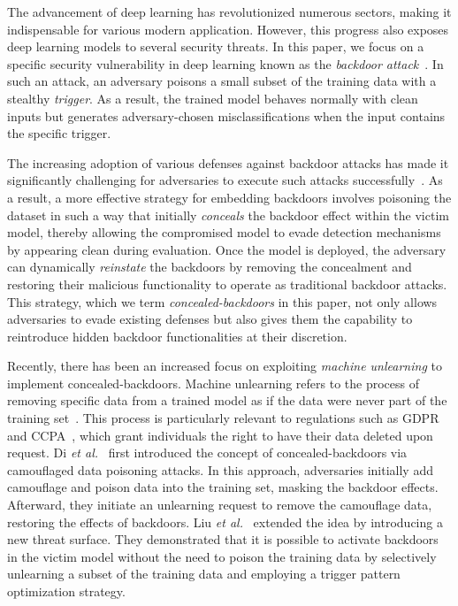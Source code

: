 The advancement of deep learning has revolutionized numerous sectors, making it indispensable for various modern application. However, this progress also exposes deep learning models to several security threats. In this paper, we focus on a specific security vulnerability in deep learning known as the \textit{backdoor attack}~\cite{trojannn,sig,badnets,refool,inputaware,blind,lira,ssba,wanet,lf,ftrojan,bppattack,poisonink}. In such an attack, an adversary poisons a small subset of the training data with a stealthy \textit{trigger}. As a result, the trained model behaves normally with clean inputs but generates adversary-chosen misclassifications when the input contains the specific trigger.

The increasing adoption of various defenses against backdoor attacks has made it significantly challenging for adversaries to execute such attacks successfully~\cite{fp,ss,ac,strip,nc,mcr,spectre,abl,nad,scan,anp,dbr-dst,dbd,ibau,clp,ep-bnp,rnp,nab,teco,beatrix,sau,npd,ftsham}. As a result, a more effective strategy for embedding backdoors involves poisoning the dataset in such a way that initially \textit{conceals} the backdoor effect within the victim model, thereby allowing the compromised model to evade detection mechanisms by appearing clean during evaluation. Once the model is deployed, the adversary can dynamically \textit{reinstate} the backdoors by removing the concealment and restoring their malicious functionality to operate as traditional backdoor attacks. This strategy, which we term \textit{concealed-backdoors} in this paper, not only allows adversaries to evade existing defenses but also gives them the capability to reintroduce hidden backdoor functionalities at their discretion.

Recently, there has been an increased focus on exploiting \textit{machine unlearning} to implement concealed-backdoors. Machine unlearning refers to the process of removing specific data from a trained model as if the data were never part of the training set~\cite{firstunlearning,makingaiforget,eternal,certified,deltagrad,sisa,amnesiac,adaptive,mcu,athena,unrollsgd,arcane,safe,ermktp}. This process is particularly relevant to regulations such as GDPR~\cite{gdpr} and CCPA~\cite{ccpa}, which grant individuals the right to have their data deleted upon request. Di \textit{et al.}~\cite{DBLP:conf/nips/DiDA0S23} first introduced the concept of concealed-backdoors via camouflaged data poisoning attacks. In this approach, adversaries initially add camouflage and poison data into the training set, masking the backdoor effects. Afterward, they initiate an unlearning request to remove the camouflage data, restoring the effects of backdoors. Liu \textit{et al.}~\cite{DBLP:conf/aaai/LiuWHM24} extended the idea by introducing a new threat surface. They demonstrated that it is possible to activate backdoors in the victim model without the need to poison the training data by selectively unlearning a subset of the training data and employing a trigger pattern optimization strategy.

